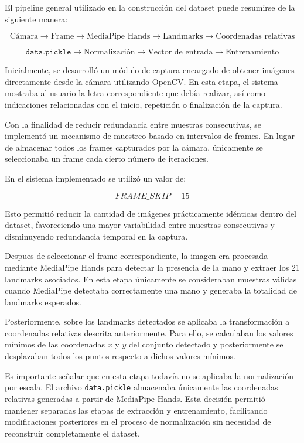 	El pipeline general utilizado en la construcción del dataset puede resumirse
	de la siguiente manera:
	
	\[
	\text{Cámara}
	\rightarrow
	\text{Frame}
	\rightarrow
	\text{MediaPipe Hands}
	\rightarrow
	\text{Landmarks}
	\rightarrow
	\text{Coordenadas relativas}
	\]
	
	\[
	\texttt{data.pickle}
	\rightarrow
	\text{Normalización}
	\rightarrow
	\text{Vector de entrada}
	\rightarrow
	\text{Entrenamiento}
	\]
	
	Inicialmente, se desarrolló un módulo de captura encargado de obtener imágenes
	directamente desde la cámara utilizando OpenCV. En esta etapa, el sistema
	mostraba al usuario la letra correspondiente que debía realizar, así como
	indicaciones relacionadas con el inicio, repetición o finalización de la captura.
	
	Con la finalidad de reducir redundancia entre muestras consecutivas, se implementó
	un mecanismo de muestreo basado en intervalos de frames. En lugar de almacenar
	todos los frames capturados por la cámara, únicamente se seleccionaba un frame
	cada cierto número de iteraciones.
	
	En el sistema implementado se utilizó un valor de:
	
	\[
	FRAME\_SKIP = 15
	\]
	
	Esto permitió reducir la cantidad de imágenes prácticamente idénticas dentro del
	dataset, favoreciendo una mayor variabilidad entre muestras consecutivas y
	disminuyendo redundancia temporal en la captura.
	
	Despues de  seleccionar el frame correspondiente, la imagen era procesada mediante
	MediaPipe Hands para detectar la presencia de la mano y extraer los 21 landmarks
	asociados. En esta etapa únicamente se consideraban muestras válidas cuando
	MediaPipe detectaba correctamente una mano y generaba la totalidad de landmarks
	esperados.
	
	Posteriormente, sobre los landmarks detectados se aplicaba la transformación a
	coordenadas relativas descrita anteriormente. Para ello, se calculaban los valores
	mínimos de las coordenadas $x$ y $y$ del conjunto detectado y posteriormente se
	desplazaban todos los puntos respecto a dichos valores mínimos.
	
	Es importante señalar que en esta etapa todavía no se aplicaba la
	normalización por escala. El archivo \texttt{data.pickle} almacenaba únicamente
	las coordenadas relativas generadas a partir de MediaPipe Hands. Esta decisión
	permitió mantener separadas las etapas de extracción y entrenamiento,
	facilitando modificaciones posteriores en el proceso de normalización sin
	necesidad de reconstruir completamente el dataset.
	
